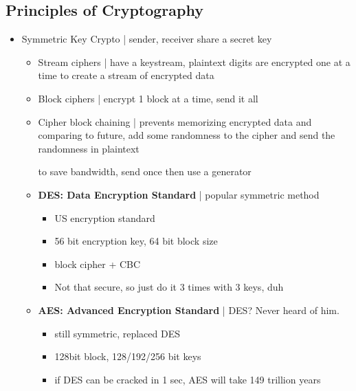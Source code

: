 \documentclass{article}
\begin{document}
\subsection{Principles of Cryptography}

\begin{itemize}
	\item Symmetric Key Crypto | sender, receiver share a secret key
	\begin{itemize}
		\item Stream ciphers | have a keystream, plaintext digits are encrypted one at a time to create a stream of encrypted data
		\item Block ciphers | encrypt 1 block at a time, send it all
		\item Cipher block chaining | prevents memorizing encrypted data and comparing to future, add some randomness to the cipher and send the randomness in plaintext
		
		to save bandwidth, send once then use a generator
		
		\item \textbf{DES: Data Encryption Standard} | popular symmetric method
		\begin{itemize}
			\item US encryption standard
			\item 56 bit encryption key, 64 bit block size
			\item block cipher + CBC
			\item Not that secure, so just do it 3 times with 3 keys, duh
		\end{itemize}
		
		\item \textbf{AES: Advanced Encryption Standard} | DES? Never heard of him.
		\begin{itemize}
			\item still symmetric, replaced DES
			\item 128bit block, 128/192/256 bit keys
			\item if DES can be cracked in 1 sec, AES will take 149 trillion years
		\end{itemize}
	\end{itemize}
	

\end{itemize}
\end{document}
